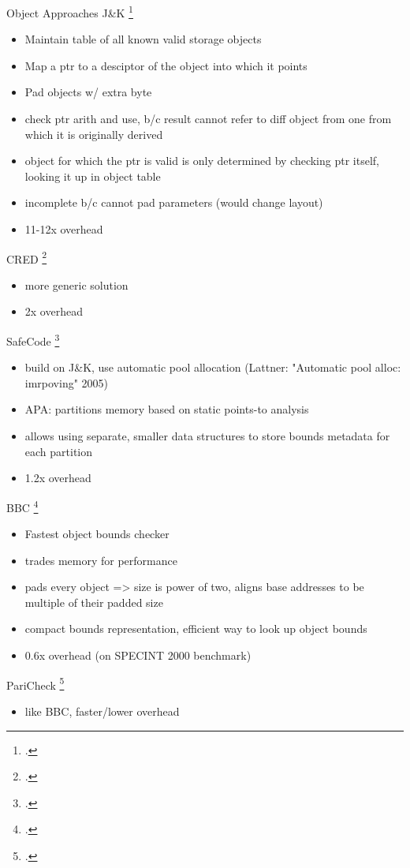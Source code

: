 \documentclass[aspectratio=169]{beamer}
\begin{document}
\begin{frame}{Object Approaches}
J\&K \footcite{jones_backwards_1997}
    \begin{itemize}
       \item Maintain table of all known valid storage objects
       \item Map a ptr to a desciptor of the object into which it points
       \item Pad objects w/ extra byte 
       \item check ptr arith and use, b/c result cannot refer to diff object from one from which it is originally derived
       \item object for which the ptr is valid is only determined by checking ptr itself, looking it up in object table
       \item incomplete b/c cannot pad parameters (would change layout)
       \item 11-12x overhead
    \end{itemize}
\vspace{0.2in}

CRED \footcite{ruwase_practical_2004}
    \begin{itemize}
      \item more generic solution
      \item 2x overhead
    \end{itemize}
\vspace{0.2in}

SafeCode \footcite{dhurjati_2006_backwards}
    \begin{itemize}
        \item build on J\&K, use automatic pool allocation (Lattner: "Automatic pool alloc: imrpoving" 2005)
        \item APA: partitions memory based on static points-to analysis
        \item allows using separate, smaller data structures to store bounds metadata for each partition
        \item 1.2x overhead
    \end{itemize}
\vspace{0.2in}

BBC \footcite{akritidis_baggy_2009}
    \begin{itemize}
    \item Fastest object bounds checker
    \item trades memory for performance
    \item pads every object => size is power of two, aligns base addresses to be multiple of their padded size
    \item compact bounds representation, efficient way to look up object bounds
    \item 0.6x overhead (on SPECINT 2000 benchmark)
    \end{itemize}
\vspace{0.2in}

PariCheck \footcite{younan_paricheck_2010}
    \begin{itemize}
        \item like BBC, faster/lower overhead
    \end{itemize}
\end{frame}
\end{document}
